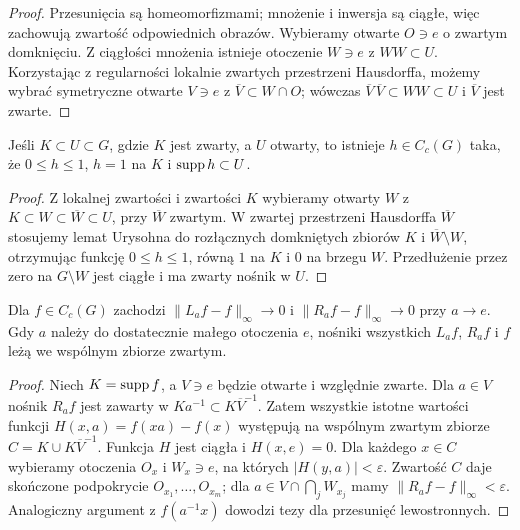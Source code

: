 \begin{proof}
Przesunięcia są homeomorfizmami; mnożenie i inwersja są ciągłe, więc zachowują zwartość odpowiednich obrazów. Wybieramy otwarte $O\ni e$ o zwartym domknięciu. Z ciągłości mnożenia istnieje otoczenie $W\ni e$ z $WW\subset U$. Korzystając z regularności lokalnie zwartych przestrzeni Hausdorffa, możemy wybrać symetryczne otwarte $V\ni e$ z $\overline V\subset W\cap O$; wówczas $\overline V\,\overline V\subset WW\subset U$ i $\overline V$ jest zwarte.
\end{proof}
\begin{lemat}
Jeśli $K\subset U\subset G$, gdzie $K$ jest zwarty, a $U$ otwarty, to istnieje $h\in C_c(G)$ taka, że $0\le h\le1$, $h=1$ na $K$ i $\operatorname{supp} h\subset U$.
\end{lemat}
\begin{proof}
Z lokalnej zwartości i zwartości $K$ wybieramy otwarty $W$ z $K\subset W\subset\overline W\subset U$, przy $\overline W$ zwartym. W zwartej przestrzeni Hausdorffa $\overline W$ stosujemy lemat Urysohna do rozłącznych domkniętych zbiorów $K$ i $\overline W\setminus W$, otrzymując funkcję $0\le h\le1$, równą $1$ na $K$ i $0$ na brzegu $W$. Przedłużenie przez zero na $G\setminus W$ jest ciągłe i ma zwarty nośnik w $U$.
\end{proof}
\begin{lemat}
Dla $f\in C_c(G)$ zachodzi $\|L_af-f\|_\infty\to0$ i $\|R_af-f\|_\infty\to0$ przy $a\to e$. Gdy $a$ należy do dostatecznie małego otoczenia $e$, nośniki wszystkich $L_af$, $R_af$ i $f$ leżą we wspólnym zbiorze zwartym.
\end{lemat}
\begin{proof}
Niech $K=\operatorname{supp} f$, a $V\ni e$ będzie otwarte i względnie zwarte. Dla $a\in V$ nośnik $R_af$ jest zawarty w $K a^{-1}\subset K\overline V^{-1}$. Zatem wszystkie istotne wartości funkcji $H(x,a)=f(xa)-f(x)$ występują na wspólnym zwartym zbiorze $C=K\cup K\overline V^{-1}$. Funkcja $H$ jest ciągła i $H(x,e)=0$. Dla każdego $x\in C$ wybieramy otoczenia $O_x$ i $W_x\ni e$, na których $|H(y,a)|<\varepsilon$. Zwartość $C$ daje skończone podpokrycie $O_{x_1},\dots,O_{x_m}$; dla $a\in V\cap\bigcap_jW_{x_j}$ mamy $\|R_af-f\|_\infty<\varepsilon$. Analogiczny argument z $f(a^{-1}x)$ dowodzi tezy dla przesunięć lewostronnych.
\end{proof}


